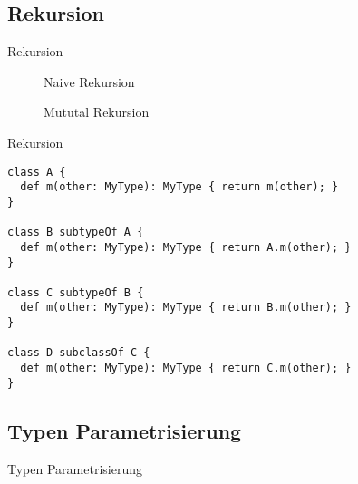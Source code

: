 \subsection{Rekursion}
\begin{frame}[c]{Rekursion}
	\begin{figure}
		\caption{Naive Rekursion}
	\end{figure}
	\begin{figure}
		\caption{Mututal Rekursion}
	\end{figure}
\end{frame}

\begin{frame}[c,fragile]{Rekursion}
\begin{lstlisting}[language=ooplss]
class A {
  def m(other: MyType): MyType { return m(other); }
}

class B subtypeOf A {
  def m(other: MyType): MyType { return A.m(other); }
}

class C subtypeOf B {
  def m(other: MyType): MyType { return B.m(other); }
}

class D subclassOf C {
  def m(other: MyType): MyType { return C.m(other); }
}
\end{lstlisting}
\end{frame}

\subsection{Typen Parametrisierung}
\begin{frame}{Typen Parametrisierung}
\end{frame}
